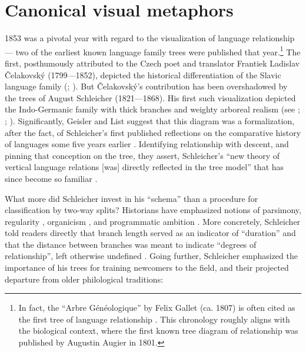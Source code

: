 \documentclass[output=paper]{langscibook}
\begin{document}
\section{Canonical visual metaphors}
\label{sec:kaplan:visualmetaphors}

1853 was a pivotal year with regard to the visualization of language relationship — two of the earliest known language family trees were published that year.\footnote{In fact, the ``Arbre Généologique'' by Felix Gallet (ca. 1807) is often cited as the first tree of language relationship \citep[242]{Hellstrom2012}. This chronology roughly aligns with the biological context, where the first known tree diagram of relationship was published by Augustin Augier in 1801.} The first, posthumously attributed to the Czech poet and translator Frantiek Ladislav Čelakovský (1799—1852), depicted the historical differentiation of the Slavic language family (\citealt[3]{Czelakovsky1853}; \citealt{Priestly1975}). But Čelakovský's contribution has been overshadowed by the trees of August Schleicher (1821—1868). His first such visualization depicted the Indo-Germanic family with thick branches and weighty arboreal realism (see \citealt{Maher1966}; \citealt{Hoenigswald1975}; \citealt{Koerner1987}). Significantly, Geisler and List suggest that this diagram was a formalization, after the fact, of Schleicher's first published reflections on the comparative history of languages some five years earlier \citep{Schleicher1848}. Identifying relationship with descent, and pinning that conception on the tree, they assert, Schleicher's ``new theory of vertical language relations [was] directly reflected in the tree model'' that has since become so familiar \citep[114]{GeislerList2013}.

What more did Schleicher invest in his ``schema'' than a procedure for classification by two-way splits? Historians have emphasized notions of parsimony, regularity \citep[117, 114--115]{GeislerList2013}, organicism \citep[56]{Wells1987}, and programmatic ambition \citep[755]{Koerner1975}. More concretely, Schleicher told readers directly that branch length served as an indicator of ``duration'' and that the distance between branches was meant to indicate ``degrees of relationship'', left otherwise undefined \citep[8]{Schleicher1853}. Going further, Schleicher emphasized the importance of his trees for training newcomers to the field, and their projected departure from older philological traditions:
\end{document}
